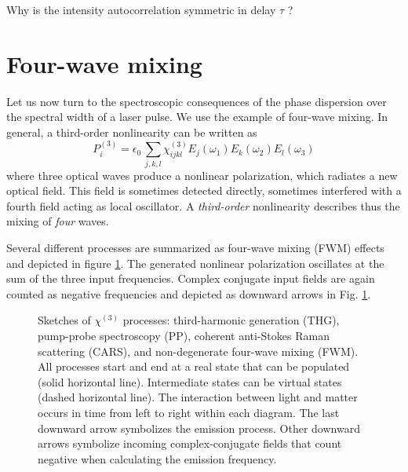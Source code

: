 \begin{questions}
\item Why is the intensity autocorrelation symmetric in delay $\tau$ ?
\end{questions}



		
\section{Four-wave mixing}

Let us now turn to the spectroscopic consequences of the phase dispersion over the spectral width of a laser pulse. We use the example of four-wave mixing. In general, a third-order nonlinearity can be written as
\begin{equation}
  P^{(3)}_i = \epsilon_0 \, 
    \sum_{j,k,l} \chi^{(3)}_{ijkl} E_j(\omega_1) E_k(\omega_2) E_l(\omega_3)  
\end{equation}		
where three optical waves produce a nonlinear polarization, which radiates a new optical field. This field is sometimes detected directly, sometimes interfered with  a fourth field acting as local oscillator. A \emph{third-order} nonlinearity describes thus the mixing of \emph{four} waves.
		
		
Several different processes are 	summarized as four-wave mixing (FWM) effects and depicted in figure \ref{fig:processes}.  The generated nonlinear polarization oscillates at the sum of the three input frequencies. Complex conjugate input fields are again counted as negative frequencies and depicted as downward arrows in Fig. \ref{fig:processes}.
	
\begin{figure}

\caption{Sketches of  $\chi^{(3)}$ processes:
%
third-harmonic generation (THG), pump-probe spectroscopy (PP), coherent anti-Stokes Raman scattering (CARS), and  non-degenerate four-wave mixing (FWM).
%
 All processes start and end at a real state  that can be populated (solid horizontal line). Intermediate states can be virtual states (dashed horizontal line). The interaction between light and matter occurs in time from left to right within each diagram. The last downward arrow symbolizes the emission process. Other downward  arrows symbolize incoming complex-conjugate fields that count negative when calculating the emission frequency.
\label{fig:processes}}
\end{figure}

